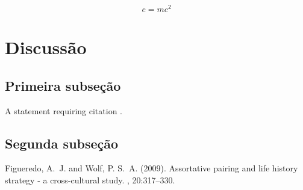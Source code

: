 \documentclass{article}
\begin{document}
\blindtext

\begin{equation}
\label{eq:emc}
e = mc^2
\end{equation}

\blindtext


\section{Discussão}

\subsection{Primeira subseção}

A statement requiring citation \cite{Figueredo:2009dg}.
\blindtext

\subsection{Segunda subseção}

\blindtext


\begin{thebibliography}{99}

Figueredo, A.~J. and Wolf, P. S.~A. (2009).
\newblock Assortative pairing and life history strategy - a cross-cultural
  study.
, 20:317--330.
 
\end{thebibliography}

\end{document}
